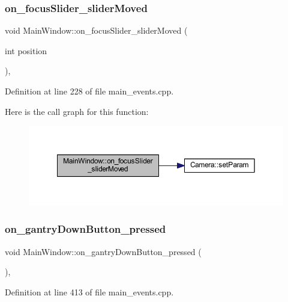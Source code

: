 \subsubsection{\texorpdfstring{on\_focusSlider\_sliderMoved}{on\_focusSlider\_sliderMoved}}
{\footnotesize\ttfamily void Main\+Window\+::on\+\_\+focus\+Slider\+\_\+slider\+Moved (\begin{DoxyParamCaption}\item[{int}]{position }\end{DoxyParamCaption})\hspace{0.3cm}{\ttfamily [private]}, {\ttfamily [slot]}}



Definition at line 228 of file main\+\_\+events.\+cpp.

Here is the call graph for this function\+:
\nopagebreak
\begin{figure}[H]
\begin{center}
\leavevmode
\includegraphics[width=350pt]{class_main_window_a4984f1218d13c28b7dd40f9e1cc9b9be_cgraph}
\end{center}
\end{figure}
\mbox{\label{class_main_window_a04c1e4428230f33e991ff87aed62575f}} 
\subsubsection{\texorpdfstring{on\_gantryDownButton\_pressed}{on\_gantryDownButton\_pressed}}
{\footnotesize\ttfamily void Main\+Window\+::on\+\_\+gantry\+Down\+Button\+\_\+pressed (\begin{DoxyParamCaption}{ }\end{DoxyParamCaption})\hspace{0.3cm}{\ttfamily [private]}, {\ttfamily [slot]}}



Definition at line 413 of file main\+\_\+events.\+cpp.

